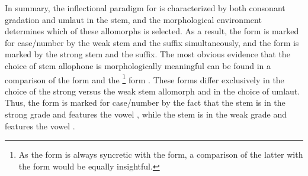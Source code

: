 In summary, the inflectional paradigm for  is characterized by both consonant gradation and umlaut in the stem, %
and the morphological environment determines which of these allomorphs is selected. %
As a result, the  form  is marked for case/number by the weak  stem and the \mbox{} suffix simultaneously, and the  form  is marked by the strong  stem and the  suffix. The most obvious evidence that the choice of stem allophone is morphologically meaningful can be found in a comparison of the  form  and the \footnote{As the  form is always syncretic with the  form, a comparison of the latter with the  form would be equally insightful.} 
form . These forms differ exclusively in the choice of the strong versus the weak stem allomorph and in the choice of umlaut. Thus, the  form  is marked for case/number by the fact that the stem is in the strong grade and features the vowel , while the  stem is in the weak grade and features the vowel . 

